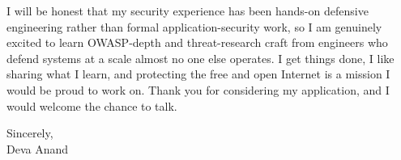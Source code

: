 \documentclass[letterpaper,11pt]{article}
\begin{document}
I will be honest that my security experience has been hands-on defensive engineering rather than formal application-security work, so I am genuinely excited to learn OWASP-depth and threat-research craft from engineers who defend systems at a scale almost no one else operates. I get things done, I like sharing what I learn, and protecting the free and open Internet is a mission I would be proud to work on. Thank you for considering my application, and I would welcome the chance to talk.

\vspace{6pt}

\noindent Sincerely,\\
Deva Anand
\end{document}
